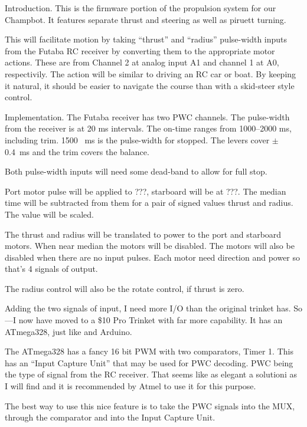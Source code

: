 


\nocon %
\datethis %


Introduction. This is the firmware portion of the propulsion system for
our
Champbot.
It features separate thrust and steering as well as piruett turning.

This will facilitate motion by taking ``thrust'' and ``radius'' pulse-width
inputs from the Futaba RC receiver by converting them to the appropriate motor
actions.
These are from Channel 2 at analog input A1 and channel 1 at A0, respectivily.
The action will be similar to driving an RC car or boat.
By keeping it natural, it should be easier to navigate the course than with a
skid-steer style control.

\fi

Implementation.
The Futaba receiver has two PWC channels.
The pulse-width from the receiver is at 20 ms intervals.
The on-time ranges from 1000--2000 ms, including trim.
1500~ ms is the pulse-width for stopped.
The levers cover $\pm$0.4~ms and the trim covers the balance.

Both pulse-width inputs will need some dead-band to allow for full stop.

Port motor pulse will be applied to ???, starboard will be at ???.
The median time will be subtracted from them for a pair of signed values
thrust and radius. The value will be scaled.

The thrust and radius will be translated to power to the
port and starboard motors. When near median the motors will be disabled.
The motors will also be disabled when there are no input pulses.
Each motor need direction and power so that's 4 signals of output.

The radius control will also be the rotate control, if thrust is zero.

Adding the two signals of input, I need more I/O than the original trinket has.
So---I now have moved to a \$10 Pro Trinket with far more capability.
It has an ATmega328, just like and Arduino.

The ATmega328 has a fancy 16 bit PWM with two comparators, Timer 1.
This has an ``Input Capture Unit'' that may be used for PWC decoding.
PWC being the type of signal from the RC receiver.
That seems like as elegant a solutioni as I will find and it is recommended by
Atmel to use it for this purpose.

The best way to use this nice feature is to
take the PWC signals into the MUX, through the comparator and into the Input
Capture Unit.

